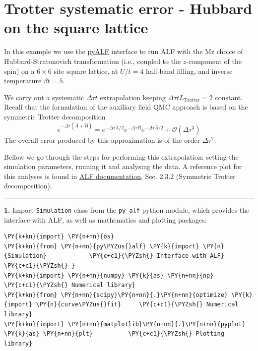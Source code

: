     
    

    
    \hypertarget{trotter-systematic-error---hubbard-on-the-square-lattice}{%
\section{Trotter systematic error - Hubbard on the square
lattice}\label{trotter-systematic-error---hubbard-on-the-square-lattice}}

    In this example we use the
\href{https://git.physik.uni-wuerzburg.de/ALF/pyALF/-/tree/ALF-2.0}{pyALF}
interface to run ALF with the Mz choice of Hubbard-Stratonovich
transformation (i.e., coupled to the \(z\)-component of the spin) on a
\(6\times 6\) site square lattice, at \(U/t=4\) half-band filling, and
inverse temperature \(\beta t = 5\).

We carry out a systematic \(\Delta \tau t\) extrapolation keeping
\(\Delta \tau t L_\text{Trotter} = 2\) constant. Recall that the
formulation of the auxiliary field QMC approach is based on the
symmetric Trotter decomposition \[
e^{ -\Delta \tau \left( \hat{A} + \hat{B} \right) }  =  e^{ -\Delta \tau \hat{A}/2}  e^{ -\Delta \tau  \hat{B}  }   e^{ -\Delta \tau \hat{A}/2}  +  \mathcal{O} \left (\Delta  \tau^3\right)
\] The overall error produced by this approximation is of the order
\(\Delta \tau^2\).

Bellow we go through the steps for performing this extrapolation:
setting the simulation parameters, running it and analysing the data. A
reference plot for this analyses is found in
\href{https://git.physik.uni-wuerzburg.de/ALF/ALF/-/blob/5a887441c8dca138ef2c9b643948d4eccee808ae/Documentation/doc.pdf}{ALF
documentation}, Sec. 2.3.2 (Symmetric Trotter decomposition).

\begin{center}\rule{0.5\linewidth}{\linethickness}\end{center}

\textbf{1.} Import \texttt{Simulation} class from the \texttt{py\_alf}
python module, which provides the interface with ALF, as well as
mathematics and plotting packages:

    \begin{tcolorbox}[breakable, size=fbox, boxrule=1pt, pad at break*=1mm,colback=cellbackground, colframe=cellborder]
\begin{Verbatim}[commandchars=\\\{\}]
\PY{k+kn}{import} \PY{n+nn}{os}
\PY{k+kn}{from} \PY{n+nn}{py\PYZus{}alf} \PY{k}{import} \PY{n}{Simulation}            \PY{c+c1}{\PYZsh{} Interface with ALF}
\PY{c+c1}{\PYZsh{} }
\PY{k+kn}{import} \PY{n+nn}{numpy} \PY{k}{as} \PY{n+nn}{np}                       \PY{c+c1}{\PYZsh{} Numerical library}
\PY{k+kn}{from} \PY{n+nn}{scipy}\PY{n+nn}{.}\PY{n+nn}{optimize} \PY{k}{import} \PY{n}{curve\PYZus{}fit}     \PY{c+c1}{\PYZsh{} Numerical library}
\PY{k+kn}{import} \PY{n+nn}{matplotlib}\PY{n+nn}{.}\PY{n+nn}{pyplot} \PY{k}{as} \PY{n+nn}{plt}          \PY{c+c1}{\PYZsh{} Plotting library}
\end{Verbatim}
\end{tcolorbox}

